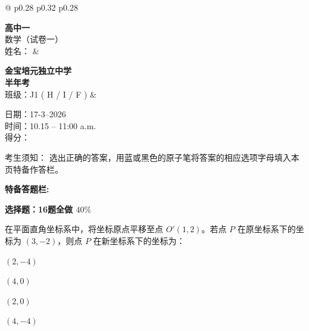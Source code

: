 \documentclass[12pt,a4paper]{exam-zh}
\begin{document}
\noindent
\begin{tabular*}{\textwidth}{@{\extracolsep{\fill}} p{0.28\textwidth} p{0.32\textwidth} p{0.28\textwidth}}

\raggedright
\textbf{高中一}\\[0.2em]
\textbf{}{数学（试卷一）}\\[0.4em]
姓名：\underline{\hspace{3cm}} &

\centering
\textbf{金宝培元独立中学}\\[0.2em]
\textbf{半年考}\\[0.4em]
班级：J1 ( H / I / F ) &

\raggedright
日期：17-3–2026\\[0.2em]
时间：10.15 – 11:00 a.m.\\[0.4em]
得分：\underline{\hspace{2.5cm}} \\

\end{tabular*}

\begin{flushleft}
考生须知： 
选出正确的答案，用蓝或黑色的原子笔将答案的相应选项字母填入本页特备作答栏。
\end{flushleft}

\begin{flushleft}
\textbf{特备答题栏:}

\end{flushleft}

\textbf{选择题：16题全做 \(40\%\)}

\begin{question}
    在平面直角坐标系中，将坐标原点平移至点 $O'(1, 2)$。若点 $P$ 在原坐标系下的坐标为 $(3, -2)$，则点 $P$ 在新坐标系下的坐标为： \paren[A]
    \begin{choices}
        \item $(2, -4)$ \item $(4, 0)$ \item $(2, 0)$ \item $(4, -4)$
    \end{choices}
\end{question}
\end{document}
